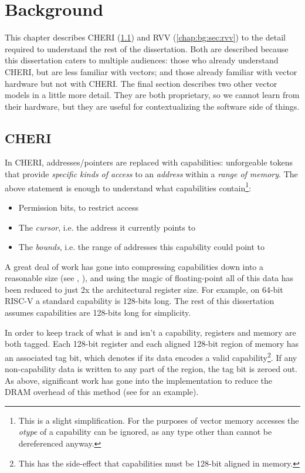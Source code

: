 \chapter{Background}

This chapter describes CHERI (\cref{chap:bg:sec:cheri}) and RVV (\cref{chap:bg:sec:rvv}) to the detail required to understand the rest of the dissertation.
Both are described because this dissertation caters to multiple audiences: those who already understand CHERI, but are less familiar with vectors; and those already familiar with vector hardware but not with CHERI.
The final section describes two other vector models in a little more detail.
They are both proprietary, so we cannot learn from their hardware, but they are useful for contextualizing the software side of things.


\section{CHERI}\label{chap:bg:sec:cheri}
In CHERI, addresses/pointers are replaced with capabilities: unforgeable tokens that provide \emph{specific kinds of access} to an \emph{address} within a \emph{range of memory}.
The above statement is enough to understand what capabilities contain\footnote{This is a slight simplification. For the purposes of vector memory accesses the \emph{otype} of a capability can be ignored, as any type other than  cannot be dereferenced anyway.}:
\begin{itemize}
    \item Permission bits, to restrict access
    \item The \emph{cursor}, i.e. the address it currently points to
    \item The \emph{bounds}, i.e. the range of addresses this capability could point to
\end{itemize}
A great deal of work has gone into compressing capabilities down into a reasonable size (see , ), and using the magic of floating-point all of this data has been reduced to just 2x the architectural register size.
For example, on 64-bit RISC-V a standard capability is 128-bits long.
The rest of this dissertation assumes capabilities are 128-bits long for simplicity.

In order to keep track of what is and isn't a capability, registers and memory are both tagged.
Each 128-bit register and each aligned 128-bit region of memory has an associated tag bit, which denotes if its data encodes a valid capability\footnote{This has the side-effect that capabilities must be 128-bit aligned in memory.}.
If any non-capability data is written to any part of the region, the tag bit is zeroed out.
As above, significant work has gone into the implementation to reduce the DRAM overhead of this method (see  for an example).


